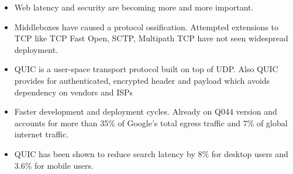 





\begin{frame}

\begin{itemize}
    \itemsep2em
    \item Web latency and security are becoming more and more important.
    
    \item Middleboxes have caused a protocol ossification. Attempted extensions to TCP like TCP Fast Open\cite{DBLP:conf/conext/RadhakrishnanCCJR11}, SCTP\cite{rfc3286}, Multipath TCP \cite{rfc6824} have not seen widespread deployment.
    
    \item QUIC is a user-space transport protocol built on top of UDP. Also QUIC provides for authenticated, encrypted header and payload which avoids dependency on vendors
    and ISPs
    
    
    \item Faster development and deployment cycles. Already on Q044 version and accounts for more than 35\% of
    Google’s total egress traffic and 7\% of global internet traffic.
    
    \item  QUIC has been shown to reduce search latency by 8\% for desktop users and 3.6\% for mobile users.\cite{DBLP:conf/sigcomm/LangleyRWVKZYKS17}
    
    
\end{itemize}
\end{frame}
\clearpage


